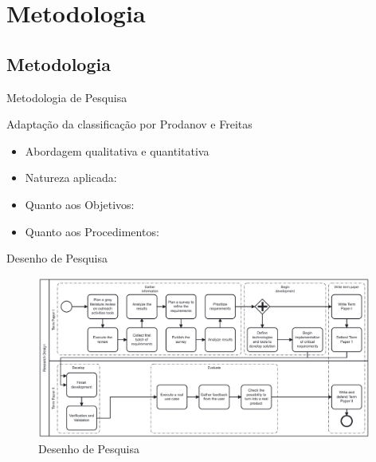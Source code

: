\section{Metodologia}
\subsection*{Metodologia}

\begin{frame}{{\sffamily Metodologia de Pesquisa}}
  \begin{block}{Adaptação da classificação por Prodanov e Freitas}
    \begin{itemize}
      \item Abordagem qualitativa e quantitativa %
      \item Natureza aplicada: %
      \item Quanto aos Objetivos: %
      \item Quanto aos Procedimentos: %

    \end{itemize}
  \end{block}
\end{frame}

\begin{frame}{{\sffamily Desenho de Pesquisa}}
  \begin{figure}
    \centering
    \caption{Desenho de Pesquisa}
    \includegraphics[width=11cm, ]{img/2-research design.pdf}
  \end{figure}
\end{frame}